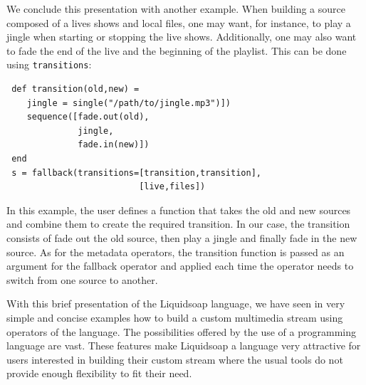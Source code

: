 \documentclass{llncs}
\newcommand{\liquidsoap}{Liquidsoap}
\begin{document}
We conclude this presentation with another example. When building a source composed
of a lives shows and local files, one may want, for instance, to play a jingle when starting
or stopping the live shows. Additionally, one may also want to fade the 
end of the live and the beginning of the playlist. This can be done using \texttt{transitions}:
\begin{verbatim}
 def transition(old,new) = 
    jingle = single("/path/to/jingle.mp3")])
    sequence([fade.out(old), 
              jingle, 
              fade.in(new)])
 end
 s = fallback(transitions=[transition,transition], 
                          [live,files])
\end{verbatim}
In this example, the user defines a function that takes the old and new sources and combine them
to create the required transition. In our case, the transition consists of fade out the old 
source, then play a jingle and finally fade in the new source. As for the metadata operators,
the transition function is passed as an argument for the fallback operator and applied 
each time the operator needs to switch from one source to another.

With this brief presentation of the \liquidsoap{} language, we have seen in very simple and 
concise examples how to build a custom multimedia stream using operators of the language. 
The possibilities offered by the use of a programming 
language are vast. These features make \liquidsoap{} a language very attractive for users
interested in building their custom stream where the usual tools do not provide 
enough flexibility to fit their need.


\end{document}
